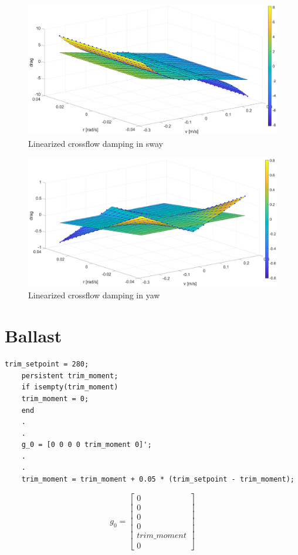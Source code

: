 \documentclass[12pt,a4]{article}
\begin{document}
\begin{figure}[H]
	\includegraphics[width = \textwidth]{graphics/SwayDampingFitting.eps}
	\caption{Linearized crossflow damping in sway}
	\label{fig:SwayDampingFitting}
\end{figure}
\begin{figure}[H]
	\includegraphics[width = \textwidth]{graphics/YawDampingFitting.eps}
	\caption{Linearized crossflow damping in yaw}
	\label{fig:YawDampingFitting}
\end{figure}

\section{Ballast}
\begin{lstlisting}[frame=single]
	trim_setpoint = 280;
	persistent trim_moment;
	if isempty(trim_moment)
	trim_moment = 0;
	end
	.
	.
	g_0 = [0 0 0 0 trim_moment 0]';
	.
	.
	trim_moment = trim_moment + 0.05 * (trim_setpoint - trim_moment);
\end{lstlisting}

\begin{equation}
	g_0 =
	\begin{bmatrix}0\\0\\0\\0\\trim\_moment\\0\end{bmatrix}
\end{equation}
\end{document}
